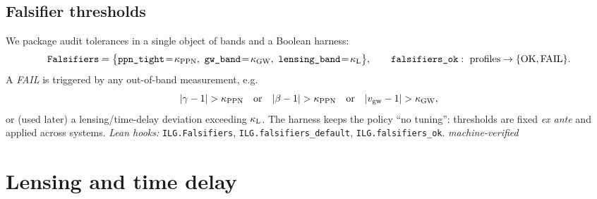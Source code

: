 \documentclass[12pt,a4paper]{article}
\begin{document}
\subsection{Falsifier thresholds}
We package audit tolerances in a single object of bands and a Boolean harness:
\[
\texttt{Falsifiers}=\bigl\{\texttt{ppn\_tight}\!=\!\kappa_{\rm PPN},\ \texttt{gw\_band}\!=\!\kappa_{\rm GW},\ \texttt{lensing\_band}\!=\!\kappa_{\rm L}\bigr\},
\qquad
\texttt{falsifiers\_ok}:\ \text{profiles}\to\{\text{OK},\text{FAIL}\}.
\]
A \emph{FAIL} is triggered by any out-of-band measurement, e.g.
\[
|\gamma-1|>\kappa_{\rm PPN}\quad\text{or}\quad|\beta-1|>\kappa_{\rm PPN}\quad\text{or}\quad|v_{\rm gw}-1|>\kappa_{\rm GW},
\]
or (used later) a lensing/time-delay deviation exceeding \(\kappa_{\rm L}\). The harness keeps the policy “no tuning”: thresholds are fixed \emph{ex ante} and applied across systems. \emph{Lean hooks:} \texttt{ILG.Falsifiers}, \texttt{ILG.falsifiers\_default}, \texttt{ILG.falsifiers\_ok}. \emph{machine-verified}

\section{Lensing and time delay}
\end{document}
